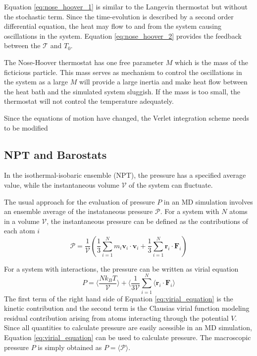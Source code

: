 Equation \ref{eq:nose_hoover_1} is similar to the Langevin thermostat but without the stochastic term.  Since the time-evolution is described by a second order differential equation, the heat may flow to and from the system causing oscillations in the system. Equation \ref{eq:nose_hoover_2} provides the feedback between the $\mathcal{T}$ and $T_0$.

The Nose-Hoover thermostat has one free parameter $M$ which is the mass of the ficticious particle.  This mass serves as mechanism to control the oscillations in the system as a large $M$ will provide a large inertia and make heat flow between the heat bath and the simulated system sluggish.  If the mass is too small, the thermostat will not control the temperature adequately.

Since the equations of motion have changed, the Verlet integration scheme needs to be modified

\subsection{NPT and Barostats}
\label{sec:npt_ensemble}
In the isothermal-isobaric ensemble (NPT), the pressure has a specified average value, while the instantaneous volume $\mathcal{V}$ of the system can fluctuate.

The usual approach for the evaluation of pressure $P$ in an MD simulation involves an ensemble average of the instataneous pressure $\mathcal{P}$\cite{allen1987_md}.  For a system with $N$ atoms in a volume $\mathcal{V}$, the instantaneous pressure can be defined as the contributions of each atom $i$
\begin{equation}
  \mathcal{P}
  =
  \frac{1}{\mathcal{V}}
  \left(
    \frac{1}{3}
    \sum_{i=1}^N m_i \bm{v}_i  \cdot \bm{v}_i
    +
    \frac{1}{3}
    \sum_{i=1}^N \bm{r}_i \cdot \bm{F}_i
  \right)
\end{equation}

For a system with interactions, the pressure can be written as virial equation\cite{tadmor2011_md}
\begin{equation}
  \label{eq:virial_equation}
  P = \langle \frac{N k_B T}{\mathcal{V}}  \rangle
      + \langle \frac{1}{3\mathcal{V}}
        \sum_{i=1}^N
        \langle \bm{r}_i \cdot \bm{F}_{i} \rangle
\end{equation}
The first term of the right hand side of Equation \ref{eq:virial_equation} is the kinetic contribution and the second term is the Clausias virial function modeling residual contribution arising from atoms interacting through the potential $V$.  Since all quantities to calculate pressure are easily acessible in an MD simulation, Equation \ref{eq:virial_equation} can be used to calculate pressure.  The macroscopic pressure $P$ is simply obtained as $P=\langle \mathcal{P} \rangle$.

